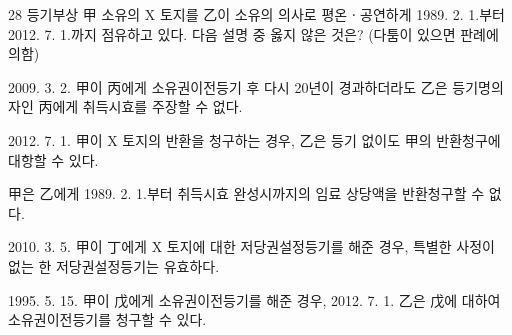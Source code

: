 \begin{question}{28}
등기부상 甲 소유의 X 토지를 乙이 소유의 의사로 평온ㆍ공연하게 1989. 2. 1.부터 2012. 7. 1.까지 점유하고 있다. 다음 설명 중 옳지 않은 것은? (다툼이 있으면 판례에 의함)
\begin{choices}
  \item 2009. 3. 2. 甲이 丙에게 소유권이전등기 후 다시 20년이 경과하더라도 乙은 등기명의자인 丙에게 취득시효를 주장할 수 없다.
  \item 2012. 7. 1. 甲이 X 토지의 반환을 청구하는 경우, 乙은 등기 없이도 甲의 반환청구에 대항할 수 있다.
  \item 甲은 乙에게 1989. 2. 1.부터 취득시효 완성시까지의 임료 상당액을 반환청구할 수 없다.
  \item 2010. 3. 5. 甲이 丁에게 X 토지에 대한 저당권설정등기를 해준 경우, 특별한 사정이 없는 한 저당권설정등기는 유효하다.
  \item 1995. 5. 15. 甲이 戊에게 소유권이전등기를 해준 경우, 2012. 7. 1. 乙은 戊에 대하여 소유권이전등기를 청구할 수 있다.
\end{choices}
\end{question}
